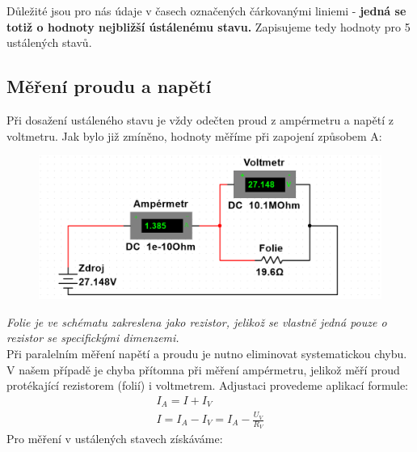 \documentclass[czech,11pt,a4paper]{article}
\begin{document}
   Důležité jsou pro nás údaje v časech označených čárkovanými liniemi - \textbf{jedná se totiž o hodnoty nejbližší ústálenému stavu.} Zapisujeme tedy hodnoty pro 5 ustálených stavů.\\
   	
   \subsection{Měření proudu a napětí}
   Při dosažení ustáleného stavu je vždy odečten proud z ampérmetru a napětí z voltmetru. Jak bylo již zmíněno, hodnoty měříme při zapojení způsobem A:
   
    \begin{figure}[H]
   	\begin{center}
   		
   		\includegraphics[width = 1\textwidth, ]{zapojeni}
   	\end{center}
   \end{figure}
   \noindent\textit{Folie je ve schématu zakreslena jako rezistor, jelikož se vlastně jedná pouze o rezistor se specifickými dimenzemi.}\\
   Při paralelním měření napětí a proudu je nutno eliminovat systematickou chybu. V našem případě je chyba přítomna při měření ampérmetru, jelikož měří proud protékající rezistorem (folií) i voltmetrem. Adjustaci provedeme aplikací formule:
   \begin{gather}
   	I_A = I + I_V\\
   	I = I_A - I_V = I_A - \frac {U_V}{R_V} 
   \end{gather}
   Pro měření v ustálených stavech získáváme:
   
\end{document}
